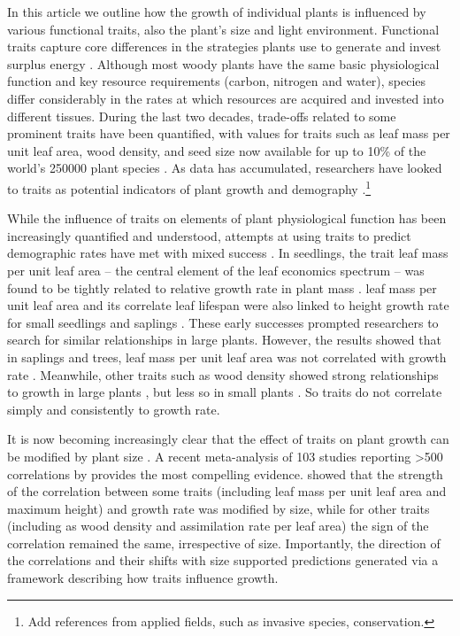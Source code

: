 \documentclass[a4paper,11pt]{article}
\begin{document}
In this article we outline how the growth of individual plants is influenced by various functional traits, also the plant's size and light environment. Functional traits capture core differences in the strategies plants use to generate and invest surplus energy \citep{Westoby-2002, Wright-2004, Chave-2009}. Although most woody plants have the same basic physiological function and key resource requirements (carbon, nitrogen and water), species differ considerably in the rates at which resources are acquired and invested into different tissues. During the last two decades, trade-offs related to some prominent traits have been quantified, with values for traits such as leaf mass per unit leaf area, wood density, and seed size now available for up to 10\% of the world's 250000 plant species \citep{Cornwell-2014}. As data has accumulated, researchers have looked to traits as potential indicators of plant growth and demography \citep{Poorter-2008, Wright-2010, Adler-2014}.\footnote{Add references from applied fields, such as invasive species, conservation.}

While the influence of traits on elements of plant physiological function has been increasingly quantified and understood, attempts at using traits to predict demographic rates have met with mixed success \citep{Poorter-2006, Poorter-2008,Wright-2010,Herault-2011,Paine-2015}. In seedlings, the trait leaf mass per unit leaf area -- the central element of the leaf economics spectrum \citep{Wright-2004} -- was found to be tightly related to relative growth rate in plant mass \citep{Lambers-1992, Wright-2000}. leaf mass per unit leaf area and its correlate leaf lifespan were also linked to height growth rate for small seedlings and saplings \citep{Reich-1992, Poorter-2006}. These early successes prompted researchers to search for similar relationships in large plants. However, the results showed that in saplings and trees, leaf mass per unit leaf area was not correlated with growth rate \citep{Poorter-2008, Wright-2010, Herault-2011, Paine-2015}. Meanwhile, other traits such as wood density showed strong relationships to growth in large plants \citep{Wright-2010,Herault-2011}, but less so in small plants \citep{Castro-1998}. So traits do not correlate simply and consistently to growth rate.

It is now becoming increasingly clear that the effect of traits on plant growth can be modified by plant size \citep{Falster-2011, Ruger-2012, Iida-2014, Visser-2016, Gibert-2016}. A recent meta-analysis of 103 studies reporting \textgreater 500 correlations by \citet{Gibert-2016} provides the most compelling evidence. \citet{Gibert-2016} showed that the strength of the correlation between some traits (including leaf mass per unit leaf area and maximum height) and growth rate was modified by size, while for other traits (including as wood density and assimilation rate per leaf area) the sign of the correlation remained the same, irrespective of size. Importantly, the direction of the correlations and their shifts with size supported predictions generated via a framework describing how traits influence growth.
\end{document}
